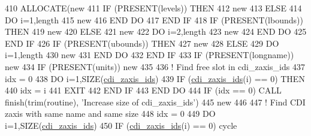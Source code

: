 \begin{DoxyCode}
410     \textcolor{keyword}{ALLOCATE}(new%
411     \textcolor{keywordflow}{IF} (\textcolor{keyword}{PRESENT}(levels)) \textcolor{keywordflow}{THEN}
412       new%
413     \textcolor{keywordflow}{ELSE}
414       \textcolor{keywordflow}{DO} i=1,length
415         new%
416 \textcolor{keywordflow}{      END DO}
417 \textcolor{keywordflow}{    END IF}
418     \textcolor{keywordflow}{IF} (\textcolor{keyword}{PRESENT}(lbounds)) \textcolor{keywordflow}{THEN}
419       new%
420     \textcolor{keywordflow}{ELSE}
421       new%
422       \textcolor{keywordflow}{DO} i=2,length
423         new%
424 \textcolor{keywordflow}{      END DO}
425 \textcolor{keywordflow}{    END IF}
426     \textcolor{keywordflow}{IF} (\textcolor{keyword}{PRESENT}(ubounds)) \textcolor{keywordflow}{THEN}
427       new%
428     \textcolor{keywordflow}{ELSE}
429       \textcolor{keywordflow}{DO} i=1,length
430         new%
431 \textcolor{keywordflow}{      END DO}
432 \textcolor{keywordflow}{    END IF}
433     \textcolor{keywordflow}{IF} (\textcolor{keyword}{PRESENT}(longname)) new%
434     \textcolor{keywordflow}{IF} (\textcolor{keyword}{PRESENT}(units)) new%
435 
436     \textcolor{comment}{! Find free slot in cdi\_zaxis\_ids}
437     idx = 0
438     \textcolor{keywordflow}{DO} i=1,\textcolor{keyword}{SIZE}(\hyperlink{namespacemo__jsb__io_a40fcb52ae787aaf48e1497bf80759dfb}{cdi\_zaxis\_ids})
439       \textcolor{keywordflow}{IF} (\hyperlink{namespacemo__jsb__io_a40fcb52ae787aaf48e1497bf80759dfb}{cdi\_zaxis\_ids}(i) == 0) \textcolor{keywordflow}{THEN}
440         idx = i
441         \textcolor{keywordflow}{EXIT}
442 \textcolor{keywordflow}{      END IF}
443 \textcolor{keywordflow}{    END DO}
444     \textcolor{keywordflow}{IF} (idx == 0) \textcolor{keyword}{CALL }finish(trim(routine), \textcolor{stringliteral}{'Increase size of cdi\_zaxis\_ids'})
445     new%
446 
447     \textcolor{comment}{! Find CDI zaxis with same name and same size}
448     idx = 0
449     \textcolor{keywordflow}{DO} i=1,\textcolor{keyword}{SIZE}(\hyperlink{namespacemo__jsb__io_a40fcb52ae787aaf48e1497bf80759dfb}{cdi\_zaxis\_ids})
450       \textcolor{keywordflow}{IF} (\hyperlink{namespacemo__jsb__io_a40fcb52ae787aaf48e1497bf80759dfb}{cdi\_zaxis\_ids}(i) == 0) cycle

\end{DoxyCode}
